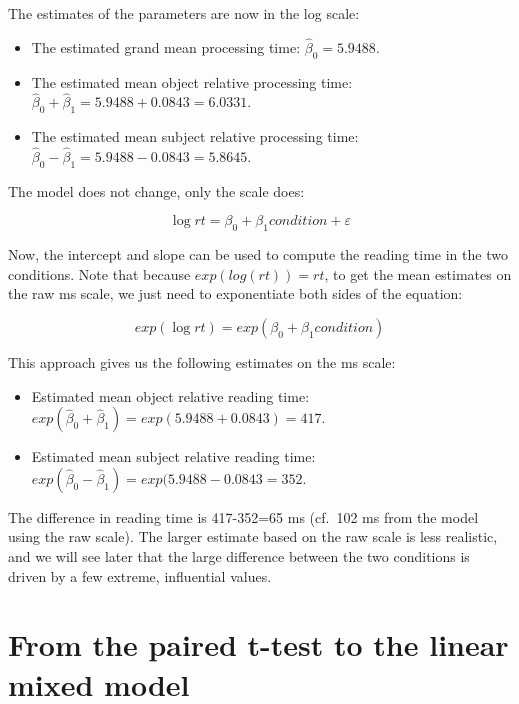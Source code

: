 \documentclass[12pt,]{krantz}
\providecommand{\tightlist}{%
  \setlength{\itemsep}{0pt}\setlength{\parskip}{0pt}}
\begin{document}
The estimates of the parameters are now in the log scale:

\begin{itemize}
\tightlist
\item
  The estimated grand mean processing time: \(\hat\beta_0=5.9488\).
\item
  The estimated mean object relative processing time: \(\hat\beta_0+\hat\beta_1=5.9488+0.0843=6.0331\).
\item
  The estimated mean subject relative processing time: \(\hat\beta_0-\hat\beta_1=5.9488-0.0843=5.8645\).
\end{itemize}

The model does not change, only the scale does:

\begin{equation}
\log rt = \beta_0 + \beta_1 condition  + \varepsilon 
\end{equation}

Now, the intercept and slope can be used to compute the reading time in the two conditions.
Note that because \(exp(log(rt))=rt\), to get the mean estimates on the raw ms scale, we just need to exponentiate both sides of the equation:

\begin{equation}
exp(\log rt) = exp( \beta_0 + \beta_1 condition)
\end{equation}

This approach gives us the following estimates on the ms scale:

\begin{itemize}
\tightlist
\item
  Estimated mean object relative reading time: \(exp(\hat\beta_0+\hat\beta_1)=exp(5.9488+0.0843)=417\).
\item
  Estimated mean subject relative reading time: \(exp(\hat\beta_0-\hat\beta_1)=exp(5.9488-0.0843=352\).
\end{itemize}

The difference in reading time is 417-352=65 ms (cf.~102 ms from the model using the raw scale). The larger estimate based on the raw scale is less realistic, and we will see later that the large difference between the two conditions is driven by a few extreme, influential values.

\hypertarget{from-the-paired-t-test-to-the-linear-mixed-model}{%
\section{From the paired t-test to the linear mixed model}\label{from-the-paired-t-test-to-the-linear-mixed-model}}
\end{document}
